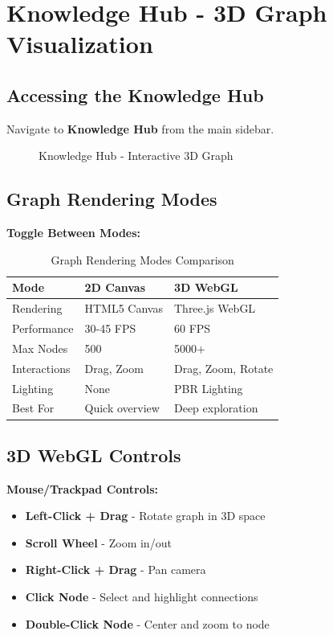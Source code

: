 \section{Knowledge Hub - 3D Graph Visualization}

\subsection{Accessing the Knowledge Hub}

Navigate to \textbf{Knowledge Hub} from the main sidebar.

\begin{figure}[h]
\centering
{}
\caption{Knowledge Hub - Interactive 3D Graph}
\label{fig:knowledge-hub}
\end{figure}

\subsection{Graph Rendering Modes}

\textbf{Toggle Between Modes:}

\begin{table}[h]
\centering
\caption{Graph Rendering Modes Comparison}
\begin{tabularx}{\textwidth}{lXX}
\toprule
\textbf{Mode} & \textbf{2D Canvas} & \textbf{3D WebGL} \\
\midrule
Rendering & HTML5 Canvas & Three.js WebGL \\
Performance & 30-45 FPS & 60 FPS \\
Max Nodes & 500 & 5000+ \\
Interactions & Drag, Zoom & Drag, Zoom, Rotate \\
Lighting & None & PBR Lighting \\
Best For & Quick overview & Deep exploration \\
\bottomrule
\end{tabularx}
\end{table}

\subsection{3D WebGL Controls}

\textbf{Mouse/Trackpad Controls:}
\begin{itemize}
    \item \textbf{Left-Click + Drag} - Rotate graph in 3D space
    \item \textbf{Scroll Wheel} - Zoom in/out
    \item \textbf{Right-Click + Drag} - Pan camera
    \item \textbf{Click Node} - Select and highlight connections
    \item \textbf{Double-Click Node} - Center and zoom to node
\end{itemize}

